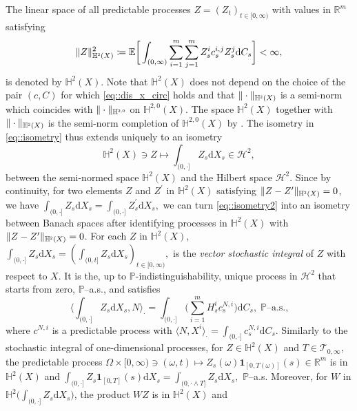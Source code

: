 \documentclass[10pt]{article} %
\newcommand\cH{\mathcal H}
\newcommand\cT{\mathcal T}
\newcommand{\smalltext}[1]{\text{\fontsize{4}{4}\selectfont$#1$}}
\def \E{\mathbb{E}}
\def \H{\mathbb{H}}
\def \P{\mathbb{P}}
\def \R{\mathbb{R}}
\newcommand{\1}{\mathbf{1}}
\def\d{\mathrm{d}}
\begin{document}
The linear space of all predictable processes $Z = (Z_t)_{t \in [0,\infty)}$ with values in $\R^m$ satisfying
\begin{equation*}
	\|Z\|^2_{\H^\smalltext{2}(X)} \coloneqq \E \bigg[ \int_{(0,\infty)}  \sum_{i=1}^m\sum_{j=1}^m Z^i_s c^{i,j}_s Z^j_s  \d C_s \bigg] < \infty,
\end{equation*}
is denoted by $\H^2(X)$. Note that $\H^2(X)$ does not depend on the choice of the pair $(c,C)$ for which \eqref{eq::dis_x_circ} holds and that $\|\cdot\|_{\H^\smalltext{2}(X)}$ is a semi-norm which coincides with $\|\cdot\|_{\H^{\smalltext{2}\smalltext{,}\smalltext{0}}}$ on $\H^{2,0}(X)$. The space $\H^2(X)$ together with $\|\cdot\|_{\H^\smalltext{2}(X)}$ is the semi-norm completion of $\H^{2,0}(X)$ by \cite[Th\'eor\`eme 4.35]{jacod1979calcul}. The isometry in \eqref{eq::isometry} thus extends uniquely to an isometry
\begin{equation}\label{eq::isometry2}
	\H^2(X) \ni Z \longmapsto \int_{(0,\cdot]} Z_s \d X_s \in \cH^2,
\end{equation}
between the semi-normed space $\H^2(X)$ and the Hilbert space $\cH^2$. Since by continuity, for two elements $Z$ and $Z^\prime$ in $\H^2(X)$ satisfying $\|Z - Z^\prime\|_{\H^\smalltext{2}(X)} = 0$, we have $\int_{(0,\cdot]} Z_s \d X_s = \int_{(0,\cdot]} Z^\prime_s \d X_s,$ we can turn \eqref{eq::isometry2} into an isometry between Banach spaces after identifying processes in $\H^2(X)$ with $\|Z-Z^\prime\|_{\H^\smalltext{2}(X)} = 0$. For each $Z$ in $\H^2(X)$, $\int_{(0,\cdot]} Z_s \d X_s = ( \int_{(0,t]} Z_s \d X_s)_{t \in [0,\infty)},$ is the \emph{vector stochastic integral} of $Z$ with respect to $X$. It is the, up to $\P$-indistinguishability, unique process in $\cH^2$ that starts from zero, $\P$--a.s., and satisfies
\begin{equation*}
	\bigg\langle \int_{(0,\cdot]} Z_s \d X_s , N \bigg\rangle_\cdot = \int_{(0,\cdot]}\bigg( \sum_{i = 1}^m H^i_s c^{N,i}_s \bigg) \d C_s, \; \text{$\P$--a.s.,}
\end{equation*}
where $c^{N,i}$ is a predictable process with $\langle N, X^i \rangle_\cdot = \int_{(0,\cdot]} c^{N,i}_s \d C_s$. Similarly to the stochastic integral of one-dimensional processes, for $Z \in \H^2(X)$ and $T \in \cT_{0,\infty}$, the predictable process $\Omega \times [0,\infty) \ni (\omega,t) \longmapsto Z_s(\omega)\mathbf{1}_{[0,T(\omega)]}(s) \in \R^m$ is in $\H^2(X)$ and $\int_{(0,\cdot]} Z_s \mathbf{1}_{[0,T]}(s) \d X_s = \int_{(0,\cdot \land T]} Z_s \d X_s,$ $\P$--a.s. Moreover, for $W$ in $\H^2 \big(\int_{(0,\cdot]}Z_s \d X_s \big)$, the product $W Z$ is in $\H^2(X)$ and
\end{document}
